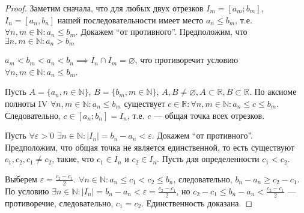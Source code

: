 \documentclass[a4paper,12pt]{article} %
\theoremstyle{remark}
\theoremstyle{definition}
\begin{document}
\begin{proof}
	Заметим сначала, что для любых двух отрезков $I_m = [a_m; b_m]$,  $I_n = [a_n, b_n]$ нашей последовательности имеет место $a_n \le b_m$, т.е. $\forall n, m \in  \mathbb{N} : a_n \le b_m$. Докажем ``от противного''. Предположим, что $\exists n, m \in  \mathbb{N} : a_n > b_m$	
\begin{center}
\end{center}
$a_m < b_m < a_n < b_n \implies I_n \cap I_m = \varnothing$, что противоречит условию $\forall n, m \in  \mathbb{N} : a_n \le b_m$.

Пусть $A = \{a_n, n \in  \mathbb{N}\}$, $B = \{b_m, m \in \mathbb{N}\}$, $A, B \neq \varnothing, A \subset \mathbb{R}, B \subset \mathbb{R}$. По аксиоме полноты IV $\forall n, m \in \mathbb{N} : a_n \le b_m$ существует $c\in \mathbb{R} : \forall n, m \in  \mathbb{N} : a_n \le  c \le  b_m$. Следовательно, $c\in [a_n; b_n] = I_n$, т.е. $c$ --- общая точка всех отрезков.

Пусть $\forall \varepsilon > 0$ $\exists n \in  \mathbb{N} : |I_n| = b_n-a_n < \varepsilon$. Докажем ``от противного''. Предположим, что общая точка не является единственной, то есть существуют $c_1, c_2, c_1\neq c_2$, такие, что $c_1 \in  I_n$ и $c_2 \in  I_n$. Пусть для определенности $c_1<c_2$.

\begin{center}
\end{center}

Выберем $\varepsilon = \frac{c_2-c_1}{2}$. $\forall n\in \mathbb{N} : a_n \le  c_1 < c_2 \le b_n$, следовательно, $b_n - a_n \ge c_2-c_1$. По условию $\exists n \in  \mathbb{N} : |I_n| = b_n - a_n < \varepsilon = \frac{c_2-c_1}{2}$, но $c_2-c_1 \le b_n  - a_n < \frac{c_2-c_1}{2}$ --- противоречие, следовательно, $c_1=c_2$. Единственность доказана.
\end{proof}
\end{document}

